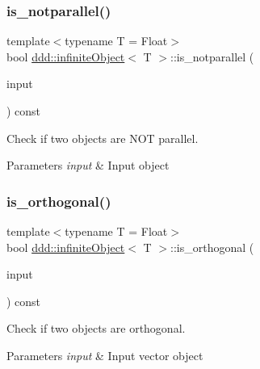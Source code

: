 \subsubsection{\texorpdfstring{is\+\_\+notparallel()}{is\_notparallel()}}
{\footnotesize\ttfamily template$<$typename T = Float$>$ \\
bool \hyperlink{classddd_1_1infinite_object}{ddd\+::infinite\+Object}$<$ T $>$\+::is\+\_\+notparallel (\begin{DoxyParamCaption}\item[{const \hyperlink{classddd_1_1infinite_object}{infinite\+Object}$<$ T $>$ \&}]{input }\end{DoxyParamCaption}) const\hspace{0.3cm}{\ttfamily [inline]}}



Check if two objects are N\+OT parallel. 


\begin{DoxyParams}{Parameters}
{\em input} & Input object \\
\hline
\end{DoxyParams}
\mbox{\label{classddd_1_1infinite_object_a634f0db3a5447756901c43f8f3d20a8a}} 
\subsubsection{\texorpdfstring{is\+\_\+orthogonal()}{is\_orthogonal()}}
{\footnotesize\ttfamily template$<$typename T = Float$>$ \\
bool \hyperlink{classddd_1_1infinite_object}{ddd\+::infinite\+Object}$<$ T $>$\+::is\+\_\+orthogonal (\begin{DoxyParamCaption}\item[{const \hyperlink{classddd_1_1infinite_object}{infinite\+Object}$<$ T $>$ \&}]{input }\end{DoxyParamCaption}) const\hspace{0.3cm}{\ttfamily [inline]}}



Check if two objects are orthogonal. 


\begin{DoxyParams}{Parameters}
{\em input} & Input vector object \\
\hline
\end{DoxyParams}
\mbox{\label{classddd_1_1infinite_object_a52c16b849e5bd987c69ed6ae79a6cab1}} 

